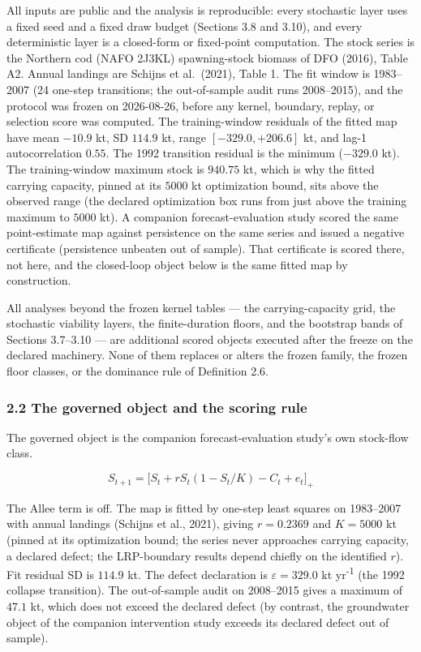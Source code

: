 All inputs are public and the analysis is reproducible: every stochastic
layer uses a fixed seed and a fixed draw budget (Sections 3.8 and 3.10),
and every deterministic layer is a closed-form or fixed-point
computation. The stock
series is the Northern cod (NAFO 2J3KL) spawning-stock biomass of DFO
(2016), Table A2. Annual landings are Schijns et al.~(2021), Table 1.
The fit window is 1983--2007 (24 one-step transitions; the out-of-sample
audit runs 2008--2015), and the protocol was frozen on 2026-08-26,
before any kernel, boundary, replay, or selection score was computed.
The training-window residuals of the fitted map have mean \(-10.9\) kt,
SD \(114.9\) kt, range \([-329.0, +206.6]\) kt, and lag-1
autocorrelation \(0.55\). The 1992 transition residual is the minimum
(\(-329.0\) kt). The training-window maximum stock is \(940.75\) kt,
which is why the fitted carrying capacity, pinned at its \(5000\) kt
optimization bound, sits above the observed range (the declared
optimization box runs from just above the training maximum to \(5000\)
kt). A companion forecast-evaluation study scored the same
point-estimate map against persistence on the same series and issued a
negative certificate (persistence unbeaten out of sample). That
certificate is scored there, not here, and the closed-loop object below
is the same fitted map by construction.

All analyses beyond the frozen kernel tables --- the carrying-capacity
grid, the stochastic viability layers, the finite-duration floors, and
the bootstrap bands of Sections 3.7--3.10 --- are additional scored
objects executed after the freeze on the declared machinery. None of
them replaces or alters the frozen family, the frozen floor classes, or
the dominance rule of Definition 2.6.

\subsubsection{2.2 The governed object and the scoring
rule}\label{budget-the-governed-object-and-the-scoring-rule}

The governed object is the companion forecast-evaluation study's own
stock-flow class.

\[S_{t+1}=\bigl[S_t+rS_t(1-S_t/K)-C_t+e_t\bigr]_+\]

The Allee term is off. The map is fitted by one-step least squares on
1983--2007 with annual landings (Schijns et al., 2021), giving
\(r = 0.2369\) and \(K = 5000\) kt (pinned at its optimization bound;
the series never approaches carrying capacity, a declared defect; the
LRP-boundary results depend chiefly on the identified \(r\)). Fit
residual SD is \(114.9\) kt. The defect declaration is
\(\varepsilon = 329.0\) kt yr\textsuperscript{-1} (the 1992 collapse transition). The
out-of-sample audit on 2008--2015 gives a maximum of \(47.1\) kt, which
does not exceed the declared defect (by contrast, the groundwater object
of the companion intervention study exceeds its declared defect out of
sample).

